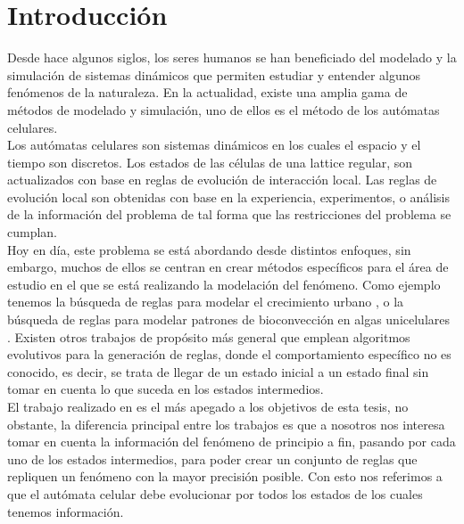 \pagestyle{fancy}
\fancyhf{}
\lhead{\leftmark}
\rhead{\thepage}
\setcounter{page}{\thesavepage}
\chapter{Introducción}
%
Desde hace algunos siglos, los seres humanos se han beneficiado del modelado y la simulación de sistemas dinámicos que permiten estudiar y entender algunos fenómenos de la naturaleza. En la actualidad, existe una amplia gama de métodos de modelado y simulación, uno de ellos es el método de los autómatas celulares. 
\\

Los autómatas celulares son sistemas dinámicos en los cuales el espacio y el tiempo son discretos. Los estados de las células de una lattice regular, son actualizados con base en reglas de evolución de interacción local. Las reglas de evolución local son obtenidas con base en la experiencia, experimentos, o análisis de la información del problema de tal forma que las restricciones del problema se cumplan.
\\

Hoy en día, este problema se está abordando desde distintos enfoques, sin embargo, muchos de ellos se centran en crear métodos específicos para el área de estudio en el que se está realizando la modelación del fenómeno. Como ejemplo tenemos la búsqueda de reglas para modelar el crecimiento urbano \citep{naghibi2016discovery}, o la búsqueda de reglas para modelar patrones de bioconvección en algas unicelulares \citep{kawaharada2016cellular}. Existen otros trabajos de propósito más general que emplean algoritmos evolutivos para la generación de reglas, donde el comportamiento específico no es conocido, es decir, se trata de llegar de un estado inicial a un estado final sin tomar en cuenta lo que suceda en los estados intermedios.
\\

El trabajo realizado en \cite{kawaharada2016cellular} es el más apegado a los objetivos de esta tesis, no obstante, la diferencia principal entre los trabajos es que a nosotros nos interesa tomar en cuenta la información del fenómeno de principio a fin, pasando por cada uno de los estados intermedios, para poder crear un conjunto de reglas que repliquen un fenómeno con la mayor precisión posible. Con esto nos referimos a que el autómata celular debe evolucionar por todos los estados de los cuales tenemos información.

